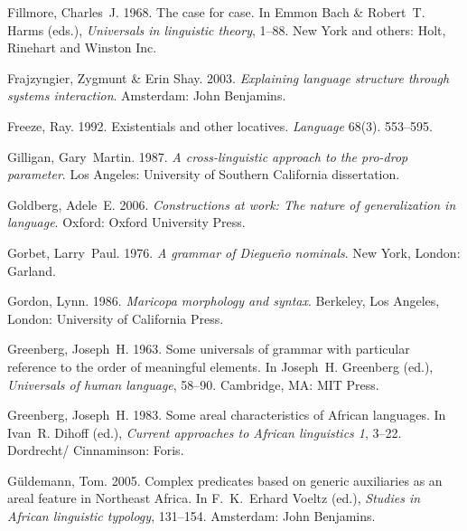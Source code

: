 \documentclass[ number=1
			   ,series=sidl
				,url=http://langsci-press.org/catalog/book/18 
			   ,isbn=978-3-944675-19-0
			   ,output=long   %
			  ]{LSP/langsci}
\begin{document}
\begin{thebibliography}{190}
Fillmore, {\relax Ch}arles~J. 1968.
\newblock The case for case.
\newblock In Emmon Bach \& Robert~T. Harms (eds.), \emph{Universals in
  linguistic theory}, 1--88. New York and others: Holt, Rinehart and Winston
  Inc.
\enlargethispage{\baselineskip}


Frajzyngier, Zygmunt \& Erin Shay. 2003.
\newblock \emph{Explaining language structure through systems interaction}.
\newblock Amsterdam: John Benjamins.

Freeze, Ray. 1992.
\newblock Existentials and other locatives.
\newblock \emph{Language} 68(3). 553--595.

Gilligan, Gary~Martin. 1987.
\newblock \emph{A cross-linguistic approach to the pro-drop parameter}.
\newblock Los Angeles: University of Southern California dissertation.

Goldberg, Adele~E. 2006.
\newblock \emph{Constructions at work: {T}he nature of generalization in
  language}.
\newblock Oxford: Oxford University Press.

Gorbet, Larry~Paul. 1976.
\newblock \emph{A grammar of {D}iegue{\~n}o nominals}.
\newblock New York, London: Garland.

Gordon, Lynn. 1986.
\newblock \emph{{M}aricopa morphology and syntax}.
\newblock Berkeley, Los Angeles, London: University of California Press.

Greenberg, Joseph~H. 1963.
\newblock Some universals of grammar with particular reference to the order of
  meaningful elements.
\newblock In Joseph~H. Greenberg (ed.), \emph{Universals of human language},
  58--90. Cambridge, MA: MIT Press.

Greenberg, Joseph~H. 1983.
\newblock Some areal characteristics of {A}frican languages.
\newblock In Ivan~R. Dihoff (ed.), \emph{Current approaches to {A}frican
  linguistics 1}, 3--22. Dordrecht/ Cinnaminson: Foris.

G{\"u}ldemann, Tom. 2005.
\newblock Complex predicates based on generic auxiliaries as an areal feature
  in {N}ortheast {A}frica.
\newblock In F.~K.~Erhard Voeltz (ed.), \emph{Studies in {A}frican linguistic
  typology}, 131--154. Amsterdam: John Benjamins.


\end{thebibliography}
\end{document}
